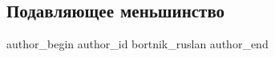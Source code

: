  
 
 
 
 
 
\subsection{Подавляющее меньшинство}
\label{sec:21_08_2021.fb.bortnik_ruslan.1.podavljajuschee_menshinstvo}
 
\ifcmt
 author_begin
   author_id bortnik_ruslan
 author_end
\fi
